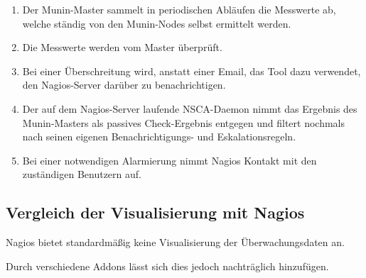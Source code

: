 \begin{enumerate}
\item Der Munin-Master sammelt in periodischen Abläufen die Messwerte ab, welche ständig von den Munin-Nodes selbst ermittelt werden.
\item Die Messwerte werden vom Master überprüft.
\item Bei einer Überschreitung wird, anstatt einer Email, das Tool  dazu verwendet, den Nagios-Server darüber zu benachrichtigen.
\item Der auf dem Nagios-Server laufende NSCA-Daemon nimmt das Ergebnis des Munin-Masters als passives Check-Ergebnis entgegen und filtert nochmals nach seinen eigenen Benachrichtigungs- und Eskalationsregeln.
\item Bei einer notwendigen Alarmierung nimmt Nagios Kontakt mit den zuständigen Benutzern auf.
\end{enumerate}

\subsection{Vergleich der Visualisierung mit Nagios}

Nagios bietet standardmäßig keine Visualisierung der Überwachungsdaten an.

Durch verschiedene Addons lässt sich dies jedoch nachträglich hinzufügen.

